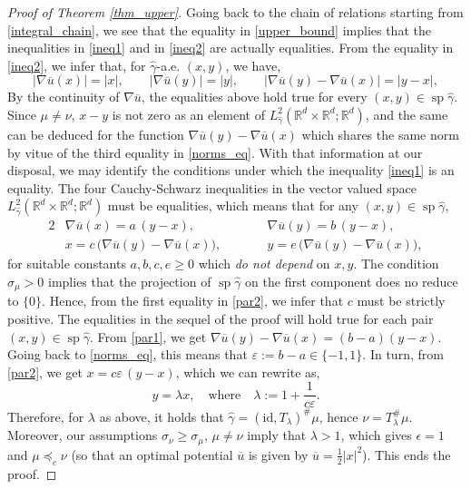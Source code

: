 \documentclass[11pt,reqno]{amsart}
\theoremstyle{definition}
\numberwithin{equation}{section}
\newcommand{\R}{\mathbb{R}}
\newcommand{\Rd}{{\R^d}}
\newcommand{\ov}{\overline}
\newcommand{\abs}[1]{{\left \lvert #1 \right \rvert}}
\newcommand{\eps}{\varepsilon}
\DeclareMathOperator{\spt}{sp}
\begin{document}
\begin{proof}[Proof of Theorem \ref{thm_upper}]
Going back to the chain of relations  starting from \eqref{integral_chain}, we see that the equality in \eqref{upper_bound} implies that the inequalities in \eqref{ineq1} and in \eqref{ineq2} are actually equalities. From the equality in  \eqref{ineq2}, we infer that, for $\hat{\gamma}$-a.e. $(x,y)$, we have,
\begin{equation}
	\label{norms_eq}
	\abs{\nabla \ov{u}(x)} = \abs{x}, \qquad \abs{\nabla \ov{u}(y)} = \abs{y}, \qquad  \abs{\nabla \ov{u}(y)-\nabla \ov{u}(x)} = \abs{y-x},
\end{equation}
 By the continuity of $\nabla \ov{u}$, the equalities above  hold true for every $(x,y) \in \spt \hat{\gamma}$. Since $\mu\not=\nu$, $x-y$ is not  zero as an element of
 $L^2_{\hat{\gamma}}(\Rd \times \Rd;\Rd)$,  and the same can be deduced for the  function  
 $\nabla \ov{u}(y) - \nabla \ov{u}(x)$ which shares the same norm by vitue of the third equality in \eqref{norms_eq}. 
% 
  With that information at our disposal, we may identify the conditions under which the inequality  \eqref{ineq1} is an equality. The four Cauchy-Schwarz inequalities in the vector valued space $L^2_{\hat{\gamma}}(\Rd \times \Rd;\Rd)$ must be equalities, which means that for any $(x,y) \in \spt \hat{\gamma}$,
\begin{alignat}{2}
	\label{par1}
	&\nabla \ov{u} (x) = a\, (y-x), \qquad  	&&\nabla \ov{u} (y) = b \, (y-x), \\
	\label{par2}
	& x = c \, \big(\nabla \ov{u}(y) - \nabla \ov{u}(x) \big), \qquad && y = e \, \big(\nabla \ov{u}(y) - \nabla \ov{u}(x) \big),
\end{alignat}
for suitable constants $a,b,c,e \geq 0$  which \emph{do not depend} on $x,y$. The condition $\sigma_\mu>0$ implies  that the projection of $\spt \hat{\gamma}$ on the first component does no reduce to $\{0\}$. Hence, from the first equality in \eqref{par2}, we infer that  $c$ must be strictly positive.
The equalities in the sequel of the proof will hold true for each pair $(x,y)\in \spt \hat{\gamma}$. 
From \eqref{par1}, we get  $\nabla \ov{u}(y)-\nabla \ov{u}(x) = (b-a) (y-x)$. Going back to \eqref{norms_eq}, this means that $\eps := b-a  \in \{-1,1\}$. In turn, from \eqref{par2}, we get $x= c \eps  \, (y-x)$,  which we can rewrite as,
\begin{equation}
	y = \lambda x, \quad \text{where} \quad  \lambda := 1+ \frac{1}{c\eps}.
\end{equation}
Therefore, for  $\lambda$ as above, it holds  that  $\hat{\gamma} = (\mathrm{id},T_\lambda) ^\# \mu$, hence $\nu = T_\lambda^\# \mu$.
Moreover, our assumptions  $\sigma_\nu \ge\sigma_\mu$, $\mu \neq \nu$ imply that $\lambda > 1$, which gives $\epsilon=1$ and  $\mu \preceq_c \nu$ (so that an optimal potential $\ov u$ is given by $\ov u= \frac1{2} |x|^2$).
 This ends the proof. 
\end{proof}
\end{document}
